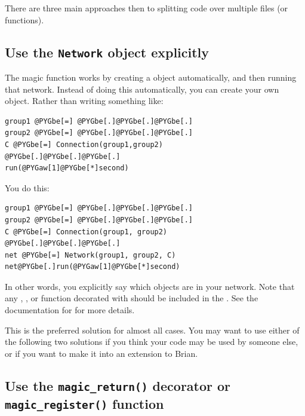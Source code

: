 \documentclass[letterpaper,10pt]{manual}
\begin{document}
There are three main approaches then to splitting code over multiple
files (or functions).

\hypertarget{index-101}{}\subsection{Use the \texttt{Network} object explicitly}

The magic \hyperlink{brian.run}{} function works by creating a \hyperlink{brian.Network}{}
object automatically, and then running that network. Instead of doing
this automatically, you can create your own \hyperlink{brian.Network}{} object.
Rather than writing something like:

\begin{Verbatim}[commandchars=@\[\]]
group1 @PYGbe[=] @PYGbe[.]@PYGbe[.]@PYGbe[.]
group2 @PYGbe[=] @PYGbe[.]@PYGbe[.]@PYGbe[.]
C @PYGbe[=] Connection(group1,group2)
@PYGbe[.]@PYGbe[.]@PYGbe[.]
run(@PYGaw[1]@PYGbe[*]second)
\end{Verbatim}

You do this:

\begin{Verbatim}[commandchars=@\[\]]
group1 @PYGbe[=] @PYGbe[.]@PYGbe[.]@PYGbe[.]
group2 @PYGbe[=] @PYGbe[.]@PYGbe[.]@PYGbe[.]
C @PYGbe[=] Connection(group1, group2)
@PYGbe[.]@PYGbe[.]@PYGbe[.]
net @PYGbe[=] Network(group1, group2, C)
net@PYGbe[.]run(@PYGaw[1]@PYGbe[*]second)
\end{Verbatim}

In other words, you explicitly say which objects are in your network.
Note that any \hyperlink{brian.NeuronGroup}{}, \hyperlink{brian.Connection}{},  or
function decorated with \hyperlink{brian.network_operation}{} should be included in the
\hyperlink{brian.Network}{}. See the documentation for \hyperlink{brian.Network}{} for more details.

This is the preferred solution for almost all cases. You may want to use either
of the following two solutions if you think your code may be used by someone
else, or if you want to make it into an extension to Brian.

\subsection{Use the \texttt{magic\_return()} decorator or \texttt{magic\_register()} function}
\end{document}
